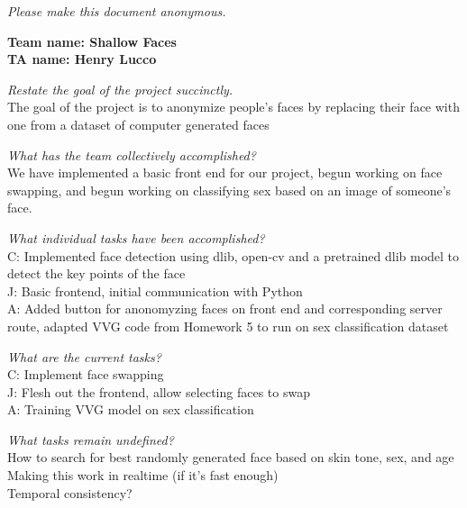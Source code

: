 \emph{Please make this document anonymous.}

\textbf{Team name: Shallow Faces}\\
\textbf{TA name: Henry Lucco}




%
\textit{Restate the goal of the project succinctly.}\\
The goal of the project is to anonymize people's faces by replacing their face with one from a dataset of computer generated faces

\textit{What has the team collectively accomplished?}\\
We have implemented a basic front end for our project, begun working on face swapping, and begun working on classifying sex based on an image of someone's face.

\textit{What individual tasks have been accomplished?}\\
C: Implemented face detection using dlib, open-cv and a pretrained dlib model to detect the key points of the face\\
J: Basic frontend, initial communication with Python\\
A: Added button for anonomyzing faces on front end and corresponding server route, adapted VVG code from Homework 5 to run on sex classification dataset

\textit{What are the current tasks?}\\
C: Implement face swapping\\
J: Flesh out the frontend, allow selecting faces to swap\\
A: Training VVG model on sex classification

\textit{What tasks remain undefined?}\\
How to search for best randomly generated face based on skin tone, sex, and age\\
Making this work in realtime (if it's fast enough)\\
Temporal consistency?

